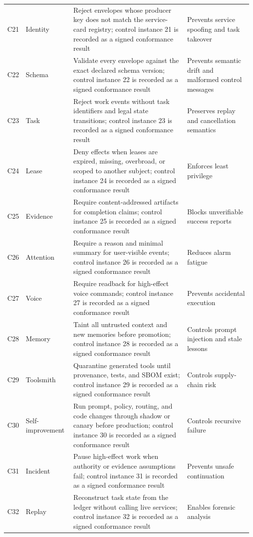 \documentclass[10pt,journal,onecolumn]{IEEEtran}
\begin{document}
\begin{longtable}{P{0.06\textwidth} P{0.14\textwidth} P{0.48\textwidth} P{0.24\textwidth}}
C21 & Identity & Reject envelopes whose producer key does not match the service-card registry; control instance 21 is recorded as a signed conformance result & Prevents service spoofing and task takeover \\
C22 & Schema & Validate every envelope against the exact declared schema version; control instance 22 is recorded as a signed conformance result & Prevents semantic drift and malformed control messages \\
C23 & Task & Reject work events without task identifiers and legal state transitions; control instance 23 is recorded as a signed conformance result & Preserves replay and cancellation semantics \\
C24 & Lease & Deny effects when leases are expired, missing, overbroad, or scoped to another subject; control instance 24 is recorded as a signed conformance result & Enforces least privilege \\
C25 & Evidence & Require content-addressed artifacts for completion claims; control instance 25 is recorded as a signed conformance result & Blocks unverifiable success reports \\
C26 & Attention & Require a reason and minimal summary for user-visible events; control instance 26 is recorded as a signed conformance result & Reduces alarm fatigue \\
C27 & Voice & Require readback for high-effect voice commands; control instance 27 is recorded as a signed conformance result & Prevents accidental execution \\
C28 & Memory & Taint all untrusted context and new memories before promotion; control instance 28 is recorded as a signed conformance result & Controls prompt injection and stale lessons \\
C29 & Toolsmith & Quarantine generated tools until provenance, tests, and SBOM exist; control instance 29 is recorded as a signed conformance result & Controls supply-chain risk \\
C30 & Self-improvement & Run prompt, policy, routing, and code changes through shadow or canary before production; control instance 30 is recorded as a signed conformance result & Controls recursive failure \\
C31 & Incident & Pause high-effect work when authority or evidence assumptions fail; control instance 31 is recorded as a signed conformance result & Prevents unsafe continuation \\
C32 & Replay & Reconstruct task state from the ledger without calling live services; control instance 32 is recorded as a signed conformance result & Enables forensic analysis \\

\end{longtable}
\end{document}
